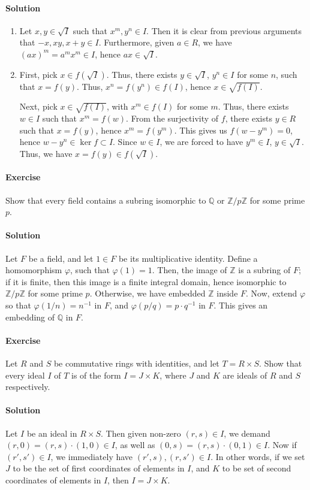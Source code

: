 \documentclass[10pt]{article}
\newcounter{prob}
\newcommand{\problem}{\stepcounter{prob}\paragraph{Exercise \arabic{prob}}}
\newcommand{\solution}{\paragraph{Solution}}
\newcommand{\Q}{\mathbb{Q}}
\newcommand{\Z}{\mathbb{Z}}
\begin{document}
    \solution \mbox{}
    \begin{enumerate}
        \item Let $x, y \in \sqrt{I}$ such that $x^m, y^n \in I$. Then it is clear
        from previous arguments that $-x, xy, x + y \in I$. Furthermore, given $a \in
        R$, we have $(ax)^m = a^mx^m \in I$, hence $ax \in \sqrt{I}$.

        \item First, pick $x \in f(\sqrt{I})$. Thus, there exists $y \in \sqrt{I}$,
        $y^n \in I$ for some $n$, such that $x = f(y)$. Thus, $x^n = f(y^n) \in
        f(I)$, hence $x \in \sqrt{f(I)}$.

        Next, pick $x \in \sqrt{f(I)}$, with $x^m \in f(I)$ for some $m$. Thus, there
        exists $w \in I$ such that $x^m = f(w)$. From the surjectivity of $f$, there
        exists $y \in R$ such that $x = f(y)$, hence $x^m = f(y^m)$. This gives us
        $f(w - y^m) = 0$, hence $w - y^n \in \ker{f} \subset I$. Since $w \in I$, we
        are forced to have $y^m \in I$, $y \in \sqrt{I}$. Thus, we have $x = f(y) \in
        f(\sqrt{I})$.
    \end{enumerate}


    \problem Show that every field contains a subring isomorphic to $\Q$ or $\Z/p\Z$
    for some prime $p$.

    \solution Let $F$ be a field, and let $1 \in F$ be its multiplicative identity.
    Define a homomorphism $\varphi$, such that $\varphi(1) = 1$. Then, the image of
    $\Z$ is a subring of $F$; if it is finite, then this image is a finite integral
    domain, hence isomorphic to $\Z / p\Z$ for some prime $p$. Otherwise, we have
    embedded $\Z$ inside $F$. Now, extend $\varphi$ so that $\varphi(1 / n) = n^{-1}$
    in $F$, and $\varphi(p / q) = p\cdot q^{-1}$ in $F$. This gives an embedding of
    $\Q$ in $F$.


    \problem Let $R$ and $S$ be commutative rings with identities, and let $T =
    R\times S$. Show that every ideal $I$ of $T$ is of the form $I = J \times K$,
    where $J$ and $K$ are ideals of $R$ and $S$ respectively.

    \solution Let $I$ be an ideal in $R \times S$. Then given non-zero $(r, s) \in
    I$, we demand $(r, 0) = (r, s)\cdot (1, 0) \in I$, as well as $(0, s) = (r,
    s)\cdot (0, 1) \in I$. Now if $(r', s') \in I$, we immediately have $(r', s), (r,
    s') \in I$. In other words, if we set $J$ to be the set of first coordinates of
    elements in $I$, and $K$ to be set of second coordinates of elements in $I$, then
    $I = J \times K$.
\end{document}
